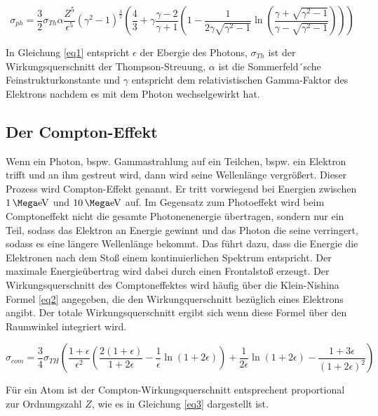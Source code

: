 \begin{equation}
    \sigma_{ph} = \frac{3}{2} \sigma_{Th} \alpha \frac{Z^5}{\epsilon^5} (\gamma^2 -1)^{\frac{3}{2}} \left(\frac{4}{3} + \gamma\frac{\gamma -2}{\gamma+1} \left(1 - \frac{1}{2 \gamma \sqrt{\gamma^2 -1}} \ln\left(\frac{\gamma + \sqrt{\gamma^2 - 1}}{\gamma - \sqrt{\gamma^2 -1}} \right) \right) \right)
    \label{eq1}
\end{equation}

In Gleichung \ref{eq1} entspricht $\epsilon$ der Ebergie des Photons, $\sigma_{Th}$
ist der Wirkungsquerschnitt der Thompson-Streuung, $\alpha$ ist die 
Sommerfeld´sche Feinstrukturkonstante und $\gamma$ entspricht dem relativistischen 
Gamma-Faktor des Elektrons nachdem es mit dem Photon wechselgewirkt hat.

\subsection{Der Compton-Effekt}
Wenn ein Photon, bspw. Gammastrahlung auf ein Teilchen, bspw. ein Elektron trifft
und an ihm gestreut wird, dann wird seine Wellenlänge vergrößert. 
Dieser Prozess wird Compton-Effekt genannt.
Er tritt vorwiegend bei Energien zwischen $\SI{1}{\Mega\electronvolt}$ und 
$\SI{10}{\Mega\electronvolt}$ auf.
Im Gegensatz zum Photoeffekt wird beim Comptoneffekt nicht die 
gesamte Photonenenergie übertragen, sondern nur ein Teil, sodass das Elektron an 
Energie gewinnt und das Photon die seine verringert, sodass es eine längere 
Wellenlänge bekommt. Das führt dazu, dass die Energie die Elektronen nach dem 
Stoß einem kontinuierlichen Spektrum entspricht.
Der maximale Energieübertrag wird dabei durch einen Frontalstoß erzeugt.
Der Wirkungsquerschnitt des Comptoneffektes wird häufig über die 
Klein-Nishina Formel \ref{eq2} angegeben, die den Wirkungquerschnitt bezüglich 
eines Elektrons angibt. Der totale Wirkungsquerschnitt ergibt sich wenn diese 
Formel über den Raumwinkel integriert wird.

\begin{equation}
    \sigma_{com} = \frac{3}{4}\sigma_{TH} \left(\frac{1 + \epsilon}{\epsilon^2} \left(\frac{2(1+\epsilon)}{1+2\epsilon} - \frac{1}{\epsilon} \ln(1+2\epsilon) \right) + \frac{1}{2\epsilon} \ln(1+2\epsilon) - \frac{1+3\epsilon}{(1+2\epsilon)^2} \right)
    \label{eq2}
\end{equation}

Für ein Atom ist der Compton-Wirkungsquerschnitt entsprechent proportional zur 
Ordnungszahl $Z$, wie es in Gleichung \ref{eq3} dargestellt ist.

